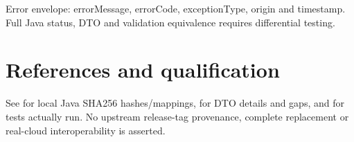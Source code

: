 \documentclass[a4paper]{arrowhead}
\begin{document}
Error envelope: errorMessage, errorCode, exceptionType, origin and timestamp. Full Java status, DTO and validation equivalence requires differential testing.
\section{References and qualification}
See  for local Java SHA256 hashes/mappings,  for DTO details and gaps, and  for tests actually run. No upstream release-tag provenance, complete replacement or real-cloud interoperability is asserted.
\end{document}
